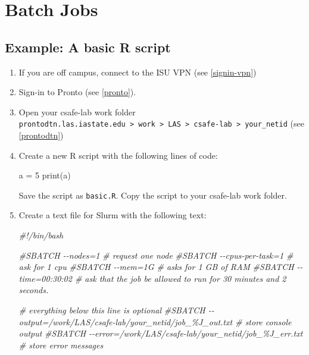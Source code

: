 \documentclass[
]{book}
\newenvironment{Shaded}{\begin{snugshade}}{\end{snugshade}}
\newcommand{\CommentTok}[1]{\textcolor[rgb]{0.56,0.35,0.01}{\textit{#1}}}
\newcommand{\DecValTok}[1]{\textcolor[rgb]{0.00,0.00,0.81}{#1}}
\newcommand{\FunctionTok}[1]{\textcolor[rgb]{0.00,0.00,0.00}{#1}}
\newcommand{\NormalTok}[1]{#1}
\newcommand{\OtherTok}[1]{\textcolor[rgb]{0.56,0.35,0.01}{#1}}
\begin{document}
\hypertarget{batch-jobs}{%
\section{Batch Jobs}\label{batch-jobs}}

\hypertarget{ex-basic}{%
\subsection{Example: A basic R script}\label{ex-basic}}

\begin{enumerate}
\def\labelenumi{\arabic{enumi}.}
\item
  If you are off campus, connect to the ISU VPN (see \ref{signin-vpn})
\item
  Sign-in to Pronto (see \ref{pronto}).
\item
  Open your csafe-lab work folder \texttt{prontodtn.las.iastate.edu\ \textgreater{}\ work\ \textgreater{}\ LAS\ \textgreater{}\ csafe-lab\ \textgreater{}\ your\_netid} (see \ref{prontodtn})
\item
  Create a new R script with the following lines of code:

\begin{Shaded}
\begin{Highlighting}[]
\NormalTok{a }\OtherTok{=} \DecValTok{5}
\FunctionTok{print}\NormalTok{(a)}
\end{Highlighting}
\end{Shaded}

  Save the script as \texttt{basic.R}. Copy the script to your csafe-lab work folder.
\item
  Create a text file for Slurm with the following text:

\begin{Shaded}
\begin{Highlighting}[]
\CommentTok{\#!/bin/bash}

\CommentTok{\#SBATCH {-}{-}nodes=1 \# request one node}
\CommentTok{\#SBATCH {-}{-}cpus{-}per{-}task=1  \# ask for 1 cpu}
\CommentTok{\#SBATCH {-}{-}mem=1G \#  asks for 1 GB of RAM}
\CommentTok{\#SBATCH {-}{-}time=00:30:02 \# ask that the job be allowed to run for 30 minutes and 2 seconds.}

\CommentTok{\# everything below this line is optional}
\CommentTok{\#SBATCH {-}{-}output=/work/LAS/csafe{-}lab/your\_netid/job\_\%J\_out.txt \# store console output}
\CommentTok{\#SBATCH {-}{-}error=/work/LAS/csafe{-}lab/your\_netid/job\_\%J\_err.txt \# store error messages}


\end{Highlighting}
\end{Shaded}
\end{enumerate}
\end{document}
